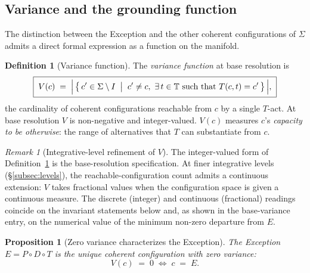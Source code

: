 \documentclass[11pt,a4paper]{article}
\newtheorem{proposition}[theorem]{Proposition}
\theoremstyle{definition}
\newtheorem{definition}[theorem]{Definition}
\theoremstyle{remark}
\newtheorem{remark}[theorem]{Remark}
\newcommand{\PDT}{\ensuremath{P{\circ}D{\circ}T}}
\begin{document}
\subsection{Variance and the grounding function}\label{subsec:variance}

The distinction between the Exception and the other coherent configurations of $\Sigma$ admits a direct formal expression as a function on the manifold.

\begin{definition}[Variance function]\label{def:variance}
The \emph{variance function} at base resolution is
\[
\boxed{\;V(c) \;=\; \Bigl|\,\bigl\{\,c' \in \Sigma \setminus I \;\bigm|\; c' \ne c,\ \exists\,t \in \mathbb{T} \text{ such that } T(c,t) = c'\,\bigr\}\,\Bigr|,\;}
\]
the cardinality of coherent configurations reachable from $c$ by a single $T$-act. At base resolution $V$ is non-negative and integer-valued. $V(c)$ measures $c$'s \emph{capacity to be otherwise}: the range of alternatives that $T$ can substantiate from $c$.
\end{definition}

\begin{remark}[Integrative-level refinement of $V$]\label{rem:V-levels}
The integer-valued form of Definition~\ref{def:variance} is the base-resolution specification. At finer integrative levels (\S\ref{subsec:levels}), the reachable-configuration count admits a continuous extension: $V$ takes fractional values when the configuration space is given a continuous measure. The discrete (integer) and continuous (fractional) readings coincide on the invariant statements below and, as shown in the base-variance entry, on the numerical value of the minimum non-zero departure from $E$.
\end{remark}

\begin{proposition}[Zero variance characterizes the Exception]\label{prop:zero-variance}
The Exception $E = \PDT$ is the unique coherent configuration with zero variance:
\[
V(c) \;=\; 0 \;\iff\; c \;=\; E.
\]
\end{proposition}
\end{document}
